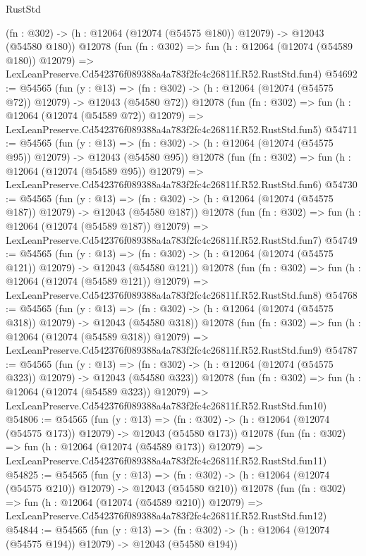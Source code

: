\begin{lexlean}{RustStd}
\begin{coremodule}
    (fn : @302) -> (h : @12064 (@12074 (@54575 @180)) @12079) -> @12043 (@54580 @180))
    @12078
    (fun (fn : @302) =>
    fun (h : @12064 (@12074 (@54589 @180)) @12079) =>
    LexLeanPreserve.Cd542376f089388a4a783f2fc4c26811f.R52.RustStd.fun4)
@54692 := @54565
    (fun (y : @13) =>
    (fn : @302) -> (h : @12064 (@12074 (@54575 @72)) @12079) -> @12043 (@54580 @72))
    @12078
    (fun (fn : @302) =>
    fun (h : @12064 (@12074 (@54589 @72)) @12079) =>
    LexLeanPreserve.Cd542376f089388a4a783f2fc4c26811f.R52.RustStd.fun5)
@54711 := @54565
    (fun (y : @13) =>
    (fn : @302) -> (h : @12064 (@12074 (@54575 @95)) @12079) -> @12043 (@54580 @95))
    @12078
    (fun (fn : @302) =>
    fun (h : @12064 (@12074 (@54589 @95)) @12079) =>
    LexLeanPreserve.Cd542376f089388a4a783f2fc4c26811f.R52.RustStd.fun6)
@54730 := @54565
    (fun (y : @13) =>
    (fn : @302) -> (h : @12064 (@12074 (@54575 @187)) @12079) -> @12043 (@54580 @187))
    @12078
    (fun (fn : @302) =>
    fun (h : @12064 (@12074 (@54589 @187)) @12079) =>
    LexLeanPreserve.Cd542376f089388a4a783f2fc4c26811f.R52.RustStd.fun7)
@54749 := @54565
    (fun (y : @13) =>
    (fn : @302) -> (h : @12064 (@12074 (@54575 @121)) @12079) -> @12043 (@54580 @121))
    @12078
    (fun (fn : @302) =>
    fun (h : @12064 (@12074 (@54589 @121)) @12079) =>
    LexLeanPreserve.Cd542376f089388a4a783f2fc4c26811f.R52.RustStd.fun8)
@54768 := @54565
    (fun (y : @13) =>
    (fn : @302) -> (h : @12064 (@12074 (@54575 @318)) @12079) -> @12043 (@54580 @318))
    @12078
    (fun (fn : @302) =>
    fun (h : @12064 (@12074 (@54589 @318)) @12079) =>
    LexLeanPreserve.Cd542376f089388a4a783f2fc4c26811f.R52.RustStd.fun9)
@54787 := @54565
    (fun (y : @13) =>
    (fn : @302) -> (h : @12064 (@12074 (@54575 @323)) @12079) -> @12043 (@54580 @323))
    @12078
    (fun (fn : @302) =>
    fun (h : @12064 (@12074 (@54589 @323)) @12079) =>
    LexLeanPreserve.Cd542376f089388a4a783f2fc4c26811f.R52.RustStd.fun10)
@54806 := @54565
    (fun (y : @13) =>
    (fn : @302) -> (h : @12064 (@12074 (@54575 @173)) @12079) -> @12043 (@54580 @173))
    @12078
    (fun (fn : @302) =>
    fun (h : @12064 (@12074 (@54589 @173)) @12079) =>
    LexLeanPreserve.Cd542376f089388a4a783f2fc4c26811f.R52.RustStd.fun11)
@54825 := @54565
    (fun (y : @13) =>
    (fn : @302) -> (h : @12064 (@12074 (@54575 @210)) @12079) -> @12043 (@54580 @210))
    @12078
    (fun (fn : @302) =>
    fun (h : @12064 (@12074 (@54589 @210)) @12079) =>
    LexLeanPreserve.Cd542376f089388a4a783f2fc4c26811f.R52.RustStd.fun12)
@54844 := @54565
    (fun (y : @13) =>
    (fn : @302) -> (h : @12064 (@12074 (@54575 @194)) @12079) -> @12043 (@54580 @194))

\end{coremodule}
\end{lexlean}
